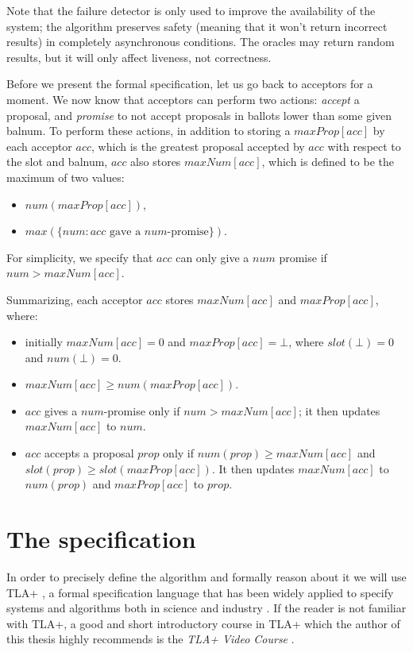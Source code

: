 \documentclass[12pt,a4paper,en]{pracamgr}
\newcommand{\ti}[1]{\textit{#1}}
\begin{document}
Note that the failure detector is only used to improve the availability of the system; the algorithm preserves safety (meaning that it won't return incorrect results) in completely asynchronous conditions. The oracles may return random results, but it will only affect liveness, not correctness.

Before we present the formal specification, let us go back to acceptors for a moment. We now know that acceptors can perform two actions: \ti{accept} a proposal, and \ti{promise} to not accept proposals in ballots lower than some given balnum. To perform these actions, in addition to storing a $maxProp[acc]$ by each acceptor $acc$, which is the greatest proposal accepted by $acc$ with respect to the slot and balnum, $acc$ also stores $maxNum[acc]$, which is defined to be the maximum of two values:
\begin{itemize}
    \item $num(maxProp[acc])$,
    \item $max(\{num: acc\text{ gave a } num\text{-promise}\})$.
\end{itemize}
For simplicity, we specify that $acc$ can only give a $num$ promise if $num > maxNum[acc]$.

Summarizing, each acceptor $acc$ stores $maxNum[acc]$ and $maxProp[acc]$, where:
\begin{itemize}
    \item initially $maxNum[acc] = 0$ and $maxProp[acc] = \bot$, where $slot(\bot) = 0$ and $num(\bot) = 0$.
    \item $maxNum[acc] \ge num(maxProp[acc])$.
    \item $acc$ gives a $num$-promise only if $num > maxNum[acc]$; it then updates $maxNum[acc]$ to $num$.
    \item $acc$ accepts a proposal $prop$ only if $num(prop) \ge maxNum[acc]$ and $slot(prop) \ge slot(maxProp[acc])$. It then updates $maxNum[acc]$ to $num(prop)$ and $maxProp[acc]$ to $prop$.
\end{itemize}

\section{The specification}\label{sect-spec}

In order to precisely define the algorithm and formally reason about it we will use TLA+ \cite{tlaplus}, a formal specification language that has been widely applied to specify systems and algorithms both in science \cite{bridging} and industry \cite{amazon}. If the reader is not familiar with TLA+, a good and short introductory course in TLA+ which the author of this thesis highly recommends is the \ti{TLA+ Video Course} \cite{tlacourse}.
\end{document}
